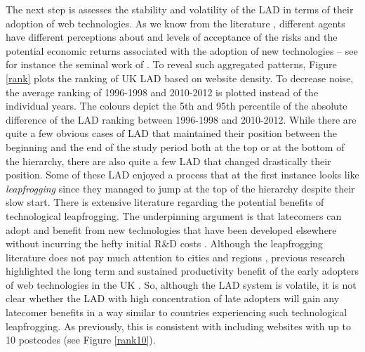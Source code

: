 \documentclass[
  authoryear,
  preprint,
  3p]{elsarticle}
\begin{document}
The next step is assesses the stability and volatility of the LAD in
terms of their adoption of web technologies. As we know from the
literature \citep{risk_perceptions}, different agents have different
perceptions about and levels of acceptance of the risks and the
potential economic returns associated with the adoption of new
technologies -- see for instance the seminal work of
\citet{venkatesh2000theoretical}. To reveal such aggregated patterns,
Figure \ref{rank} plots the ranking of UK LAD based on website density.
To decrease noise, the average ranking of 1996-1998 and 2010-2012 is
plotted instead of the individual years. The colours depict the 5th and
95th percentile of the absolute difference of the LAD ranking between
1996-1998 and 2010-2012. While there are quite a few obvious cases of
LAD that maintained their position between the beginning and the end of
the study period both at the top or at the bottom of the hierarchy,
there are also quite a few LAD that changed drastically their position.
Some of these LAD enjoyed a process that at the first instance looks
like \emph{leapfrogging} since they managed to jump at the top of the
hierarchy despite their slow start. There is extensive literature
regarding the potential benefits of technological leapfrogging. The
underpinning argument is that latecomers can adopt and benefit from new
technologies that have been developed elsewhere without incurring the
hefty initial R\&D costs \citep{teece2008firm}. Although the
leapfrogging literature does not pay much attention to cities and
regions \citep{yu2018sustainability}, previous research highlighted the
long term and sustained productivity benefit of the early adopters of
web technologies in the UK \citep{tranosuk}. So, although the LAD system
is volatile, it is not clear whether the LAD with high concentration of
late adopters will gain any latecomer benefits in a way similar to
countries experiencing such technological leapfrogging. As previously,
this is consistent with including websites with up to 10 postcodes (see
Figure \ref{rank10}).
\end{document}

